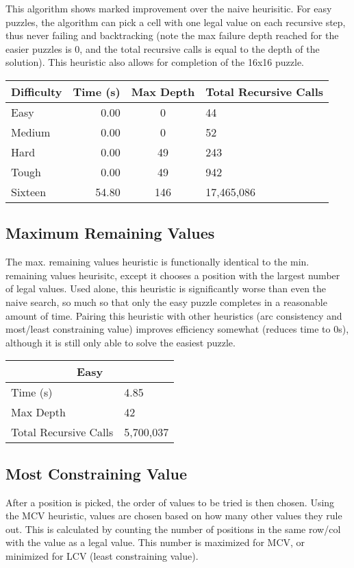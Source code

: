 \documentclass{article}
\begin{document}
This algorithm shows marked improvement over the naive heurisitic. For easy 
puzzles, the algorithm can pick a cell with one legal value on each recursive
step, thus never failing and backtracking (note the max failure depth reached
for the easier puzzles is 0, and the total recursive calls is equal to the
depth of the solution). This heuristic also allows for 
completion of the 16x16 puzzle.  \bigskip

\begin{tabular}{l || r | c | l }
Difficulty & Time (s) & Max Depth & Total Recursive Calls \\ \hline
Easy    & 0.00   & 0   & 44 \\
Medium  & 0.00   & 0   & 52 \\
Hard    & 0.00   & 49  & 243 \\
Tough   & 0.00   & 49  & 942 \\
Sixteen & 54.80 & 146 & 17,465,086 \\ 
\end{tabular}

\subsection{Maximum Remaining Values}
The max. remaining values heuristic is functionally identical to the
min. remaining values heurisitc, except it chooses a position with the largest
number of legal values. Used alone, this heuristic is significantly
worse than even the naive search, so much so that only the easy puzzle
completes in a reasonable amount of time. Pairing this heuristic with
other heuristics (arc consistency and most/least constraining value)
improves efficiency somewhat (reduces time to 0s), 
although it is still only able to solve the easiest puzzle. \bigskip

\begin{tabular}{l | l}
\multicolumn{2}{c}{Easy} \\
\hline
Time (s) & 4.85 \\
Max Depth & 42 \\
Total Recursive Calls & 5,700,037 \\
\end{tabular}


\subsection{Most Constraining Value}
After a position is picked, the order
of values to be tried is then chosen. Using the MCV heuristic, values are
chosen based on how many other values they rule out. This is calculated by
counting the number of positions in the same row/col with the value as a legal
value. This number is maximized for MCV, or minimized for LCV (least 
constraining value). 
\end{document}
